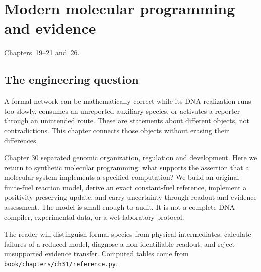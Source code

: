 \chapter{Modern molecular programming and evidence}
\label{ch:dna31}
{Chapters~19--21 and~26.}
\section{The engineering question}
A formal network can be mathematically correct while its DNA realization runs
too slowly, consumes an unreported auxiliary species, or activates a reporter
through an unintended route. These are statements about different objects,
not contradictions. This chapter connects those objects without erasing their
differences.

Chapter 30 separated genomic organization, regulation and development. Here we
return to synthetic molecular programming: what supports the assertion that a
molecular system implements a specified computation? We build an original
finite-fuel reaction model, derive an exact constant-fuel reference, implement a
positivity-preserving update, and carry uncertainty through readout and evidence
assessment. The model is small enough to audit. It is not a complete DNA compiler,
experimental data, or a wet-laboratory protocol.

The reader will distinguish formal species from physical intermediates,
calculate failures of a reduced model, diagnose a non-identifiable readout, and
reject unsupported evidence transfer. Computed tables come from
\texttt{book/chapters/ch31/reference.py}.

